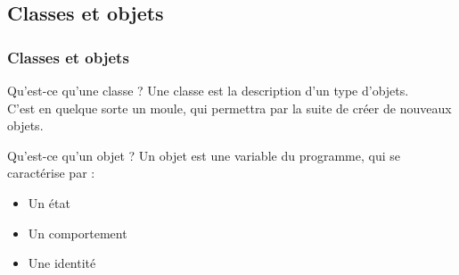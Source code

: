 \documentclass{beamer}
\begin{document}
\subsection{Classes et objets}
\begin{frame}
\frametitle{Classes et objets}
\begin{block}{Qu'est-ce qu'une classe ?}
Une classe est la description d'un type d'objets. \\ 
C'est en quelque sorte un moule, qui permettra par la suite de créer de nouveaux objets.
\end{block}
\begin{block}{Qu'est-ce qu'un objet ?}
Un objet est une variable du programme, qui se caractérise par :
\begin{itemize}
\item{Un état}
\item{Un comportement}
\item{Une identité}
\end{itemize}
\end{block}
\end{frame}
\end{document}
